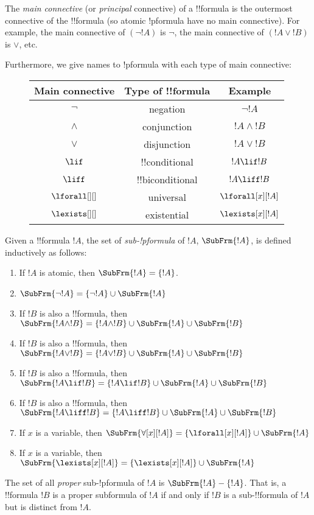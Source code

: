 \documentclass[../../include/open-logic-section]{subfiles}
\begin{document}
\begin{defn}
The \emph{main connective} (or \emph{principal} connective) of a
!!{formula} is the outermost connective of the !!{formula} (so atomic
!p{formula} have no main connective). For example, the main connective
of $(\lnot !A)$ is $\lnot$, the main connective of $(!A \lor !B)$ is
$\lor$, etc.

Furthermore, we give names to !p{formula} with each type of main connective:

\begin{figure}[!h]
\centering
\begin{tabular}{| c | c | c |}
\hline
Main connective & Type of !!{formula} & Example\\
\hline
$\lnot$ & negation & $\lnot !A$ \\
$\land$ & conjunction & $!A \land !B$ \\
$\lor$ & disjunction & $!A \lor !B$ \\
$\lif$ & !!{conditional} & $!A \lif !B$ \\
$\liff$ & !!{biconditional} & $!A \liff !B$ \\
$\lforall[][]$ & universal & $\lforall[x][!A]$ \\
$\lexists[][]$ & existential & $\lexists[x][!A]$\\ \hline
\end{tabular}
\end{figure}

\end{defn}

\begin{defn}
Given a !!{formula} $!A$, the set of \emph{sub-!p{formula}} of $!A$,
$\SubFrm{!A}$, is defined inductively as follows:
\begin{enumerate}
\item If $!A$ is atomic, then $\SubFrm{!A} = \{!A\}$.
\item $\SubFrm{\lnot !A} = \{\lnot !A\} \cup \SubFrm{!A}$
\item If $!B$ is also a !!{formula}, then $\SubFrm{!A \land !B} = \{!A
  \land !B\} \cup \SubFrm{!A} \cup \SubFrm{!B}$
\item If $!B$ is also a !!{formula}, then $\SubFrm{!A \lor !B} = \{!A \lor
  !B\} \cup \SubFrm{!A} \cup \SubFrm{!B}$
\item If $!B$ is also a !!{formula}, then $\SubFrm{!A \lif !B} = \{!A \lif
  !B\} \cup \SubFrm{!A} \cup \SubFrm{!B}$
\item If $!B$ is also a !!{formula}, then $\SubFrm{!A \liff !B} = \{!A
  \liff !B\} \cup \SubFrm{!A} \cup \SubFrm{!B}$
\item If $x$ is a variable, then $\SubFrm{\forall[x][!A]} =
  \{\lforall[x][!A]\} \cup \SubFrm{!A}$
\item If $x$ is a variable, then $\SubFrm{\lexists[x][!A]} =
  \{\lexists[x][!A]\} \cup \SubFrm{!A}$
\end{enumerate}
The set of all \emph{proper} sub-!p{formula} of $!A$ is $\SubFrm{!A} -
\{!A\}$. That is, a !!{formula} $!B$ is a proper subformula of $!A$ if and
only if $!B$ is a sub-!!{formula} of $!A$ but is distinct from $!A$.
\end{defn}
\end{document}
